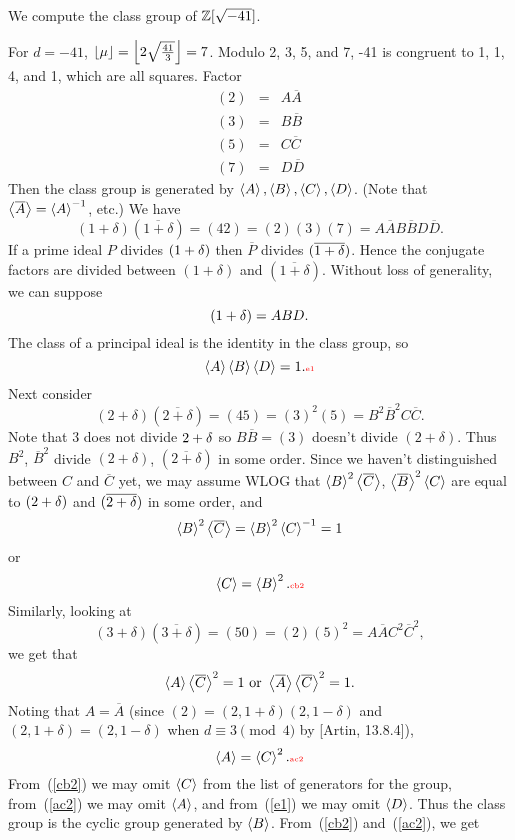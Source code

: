 \begin{ex}
We compute the class group of $\mathbb{Z}[\sqrt{-41}]$.

For $d=-41$, $\lfloor\mu\rfloor=\left\lfloor {2\sqrt{\frac{41}{3}}}\right\rfloor=7$. Modulo 2, 3, 5, and 7, -41 is congruent to 1, 1, 4, and 1, which are all squares. Factor 
\begin{eqnarray*}
(2)&=&A\overline{A}\\
(3)&=&B\overline{B}\\
(5)&=&C\overline{C}\\
(7)&=&D\overline{D}
\end{eqnarray*}
Then the class group is generated by $\left\langle {A}\right\rangle,\left\langle {B}\right\rangle,\left\langle {C}\right\rangle, \left\langle {D}\right\rangle$. (Note that $\left\langle {\overline{A}}\right\rangle=\left\langle {A}\right\rangle^{-1}$, etc.) We have%
\[(1+\delta)(\overline{1+\delta})=(42)=(2)(3)(7)=A\overline{A}B\overline{B}D\overline{D}.\]
If a prime ideal $P$ divides $(1+\delta)$ then $\overline{P}$ divides $(\overline{1+\delta})$. Hence the conjugate factors are divided between $(1+\delta)$ and $(\overline{1+\delta})$. Without loss of generality, we can suppose
\[(1+\delta)=ABD.\]
The class of a principal ideal is the identity in the class group, so
\begin{equation}\an{A}\an{B}\an{D}=1.\llabel{e1}\end{equation}
Next consider
\[(2+\delta)(\overline{2+\delta})=(45)=(3)^2(5)=B^2\overline{B}^2 C\overline{C}.\]
Note that 3 does not divide $2+\delta$ so $B\overline{B}=(3)$ doesn't divide $(2+\delta)$. Thus $B^2$, $\overline{B}^2$ divide $(2+\delta)$, $(\overline{2+\delta})$ in some order. Since we haven't distinguished between $C$ and $\overline{C}$ yet, we may assume WLOG that $\left\langle {B}\right\rangle^2\left\langle {\overline{C}}\right\rangle$, $\left\langle {\overline{B}}\right\rangle^2\left\langle {C}\right\rangle$ are equal to $(2+\delta)$ and $(\overline{2+\delta})$ in some order, and
\[\left\langle {B}\right\rangle^2\left\langle {\overline{C}}\right\rangle=\left\langle {B}\right\rangle^2\left\langle {C}\right\rangle^{-1}=1\]
or
\begin{equation}
\an{C}=\an{B}^2.\llabel{cb2}
\end{equation}
Similarly, looking at 
\[(3+\delta)(\overline{3+\delta})=(50)=(2)(5)^2=A\overline{A} C^2\overline{C}^2,\]
 we get that 
\[\left\langle {A}\right\rangle\left\langle {\overline{C}}\right\rangle^{2}=1\text{ or } \left\langle {\overline{A}}\right\rangle\left\langle {\overline{C}}\right\rangle^{2}=1.\]
Noting that $A=\overline{A}$ (since $(2)=(2,1+\delta)(2,1-\delta)$ and $(2,1+\delta)=(2,1-\delta)$ when $d\equiv 3\pmod{4}$ by [Artin, 13.8.4]),
\begin{equation}
\an{A}=\an{C}^2.\llabel{ac2}
\end{equation}
From~(\ref{cb2}) we may omit $\left\langle {C}\right\rangle$ from the list of generators for the group, from~(\ref{ac2}) we may omit $\left\langle {A}\right\rangle$, and from~(\ref{e1}) we may omit $\left\langle {D}\right\rangle$. Thus the class group is the cyclic group generated by $\left\langle {B}\right\rangle$. From~(\ref{cb2}) and~(\ref{ac2}), we get 

\end{ex}
